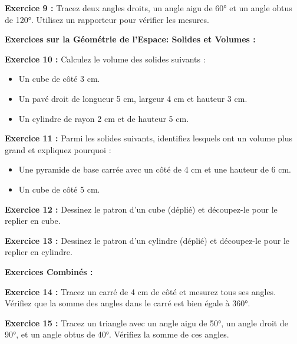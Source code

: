 \documentclass{article}
\begin{document}
\begin{tcolorbox}[colback=yellow!10!white, colframe=yellow!75!black, title=\textcolor{white}{Exercices}, sharp corners=south]
    \textbf{Exercice 9 :} Tracez deux angles droits, un angle aigu de 60° et un angle obtus de 120°. Utilisez un rapporteur pour vérifier les mesures.
    
    \vspace{10pt}
    
    \textbf{Exercices sur la Géométrie de l'Espace: Solides et Volumes :}
    
    \vspace{5pt}
    
    \textbf{Exercice 10 :} Calculez le volume des solides suivants :
    \begin{itemize}
        \item Un cube de côté 3 cm.
        \item Un pavé droit de longueur 5 cm, largeur 4 cm et hauteur 3 cm.
        \item Un cylindre de rayon 2 cm et de hauteur 5 cm.
    \end{itemize}
    
    \textbf{Exercice 11 :} Parmi les solides suivants, identifiez lesquels ont un volume plus grand et expliquez pourquoi :
    \begin{itemize}
        \item Une pyramide de base carrée avec un côté de 4 cm et une hauteur de 6 cm.
        \item Un cube de côté 5 cm.
    \end{itemize}
    
    \textbf{Exercice 12 :} Dessinez le patron d'un cube (déplié) et découpez-le pour le replier en cube.
    
    \textbf{Exercice 13 :} Dessinez le patron d'un cylindre (déplié) et découpez-le pour le replier en cylindre.
    
    \vspace{10pt}
    
    \textbf{Exercices Combinés :}
    
    \vspace{5pt}
    
    \textbf{Exercice 14 :} Tracez un carré de 4 cm de côté et mesurez tous ses angles. Vérifiez que la somme des angles dans le carré est bien égale à 360°.
    
    \textbf{Exercice 15 :} Tracez un triangle avec un angle aigu de 50°, un angle droit de 90°, et un angle obtus de 40°. Vérifiez la somme de ces angles.
    
\end{tcolorbox}
\end{document}
